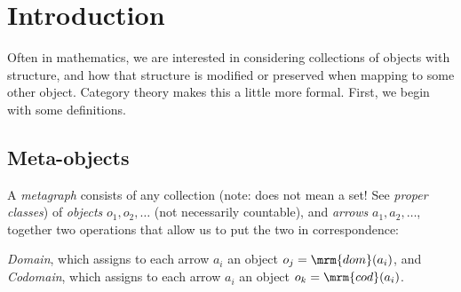 \section{Introduction}
Often in mathematics, we are interested in considering collections of
objects with structure, and how that structure is modified or
preserved when mapping to some other object. Category theory makes
this a little more formal. First, we begin with some definitions.\\

\subsection{Meta-objects}
\begin{definition}[Metagraph]
  A \emph{metagraph} consists of any collection (note: does not mean a
  set! See \emph{proper classes}) of \emph{objects} $o_1, o_2,
  \ldots$ (not necessarily countable), and \emph{arrows} $a_1, a_2,
  \ldots$, together two operations that allow us to put the two in
  correspondence:\\
\end{definition}
\begin{definition}
  \emph{Domain}, which assigns to each arrow $a_i$ an object $o_j =
  \mrm{dom}(a_i)$, and \emph{Codomain}, which assigns to each arrow
  $a_i$ an object $o_k = \mrm{cod}(a_i)$.
\end{definition}

